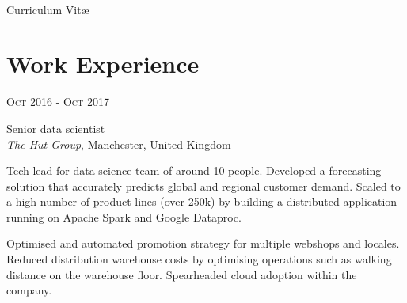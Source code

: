 \documentclass[10pt]{article} %
\begin{document}
\color{text1} %


\par{\\ %
{\color{headings} Curriculum {Vit\ae}\\[15pt]\par} %


\begin{minipage}[t]{0.58\textwidth} %
\vspace{0pt} %


\section{Work Experience}


{\raggedleft\textsc{Oct 2016 - Oct 2017}\par}

{\raggedright\large Senior data scientist\\
\textit{The Hut Group}, Manchester, United Kingdom\\[5pt]}

\normalsize{Tech lead for data science team of around 10 people. 
Developed a forecasting solution that accurately predicts global 
and regional customer demand. Scaled to a high number of product 
lines (over 250k) by building a distributed application running 
on Apache Spark and Google Dataproc.

Optimised and automated promotion strategy for multiple webshops and locales.
Reduced distribution warehouse costs by optimising operations such 
as walking distance on the warehouse floor.
Spearheaded cloud adoption within the company.}\\


\end{minipage}}
\end{document}
